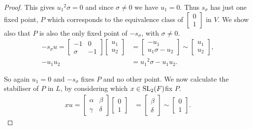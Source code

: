 \begin{proof}
This gives ${u_1}^2 \sigma = 0$ and since $\sigma \neq 0$ we have $u_1 = 0$. Thus $s_\sigma$ has just one fixed point, $P$ which corresponds to the equivalence class of $\begin{bmatrix} 0 \\ 1 \end{bmatrix}$ in $V$. We show also that $P$ is also the only fixed point of $-s_\sigma$, with $\sigma \neq 0$.
\begin{align*} -s_\sigma u = \begin{bmatrix} -1 & 0 \\ \sigma & -1 \end{bmatrix} \begin{bmatrix} u_1 \\ u_2 \end{bmatrix} &= \begin{bmatrix} -u_1 \\ u_1 \sigma - u_2 \end{bmatrix} \sim \begin{bmatrix} u_1 \\ u_2 \end{bmatrix}, 
\\[1.5ex] -u_1 u_2 &= {u_1}^2 \sigma - u_1 u_2.
\end{align*}

So again $u_1 =0$ and $-s_\sigma$ fixes $P$ and no other point. We now calculate the stabiliser of $P$ in $L$, by considering which $x \in \operatorname{SL}_2(F)$fix $P$. \\
\begin{align*} x u = \begin{bmatrix} \alpha & \beta \\ \gamma & \delta \end{bmatrix} \begin{bmatrix} 0 \\ 1 \end{bmatrix} &= \begin{bmatrix} \beta \\ \delta \end{bmatrix} \sim \begin{bmatrix} 0 \\ 1 \end{bmatrix}.
\end{align*}


\end{proof}
